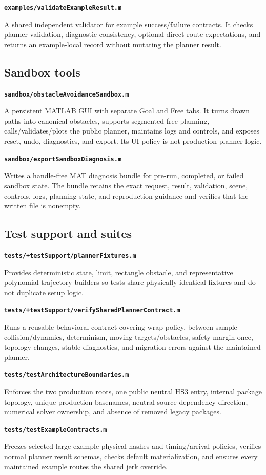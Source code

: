 \documentclass[10pt,letterpaper]{article}
\newcommand{\file}[1]{\nolinkurl{#1}}
\newcommand{\scriptentry}[2]{%
  \par\medskip\noindent\textbf{\file{#1}}\par
  \begingroup\raggedright #2\par\endgroup
}
\begin{document}
\scriptentry{examples/validateExampleResult.m}{A shared independent validator
for example success/failure contracts. It checks planner validation, diagnostic
consistency, optional direct-route expectations, and returns an example-local
record without mutating the planner result.}

\subsection{Sandbox tools}

\scriptentry{sandbox/obstacleAvoidanceSandbox.m}{A persistent MATLAB GUI with
separate Goal and Free tabs. It turns drawn paths into canonical obstacles,
supports segmented free planning, calls/validates/plots the public planner,
maintains logs and controls, and exposes reset, undo, diagnostics, and export.
Its UI policy is not production planner logic.}

\scriptentry{sandbox/exportSandboxDiagnosis.m}{Writes a handle-free MAT diagnosis
bundle for pre-run, completed, or failed sandbox state. The bundle retains the
exact request, result, validation, scene, controls, logs, planning state, and
reproduction guidance and verifies that the written file is nonempty.}

\subsection{Test support and suites}

\scriptentry{tests/+testSupport/plannerFixtures.m}{Provides deterministic state,
limit, rectangle obstacle, and representative polynomial trajectory builders so
tests share physically identical fixtures and do not duplicate setup logic.}

\scriptentry{tests/+testSupport/verifySharedPlannerContract.m}{Runs a reusable
behavioral contract covering wrap policy, between-sample collision/dynamics,
determinism, moving targets/obstacles, safety margin once, topology changes,
stable diagnostics, and migration errors against the maintained planner.}

\scriptentry{tests/testArchitectureBoundaries.m}{Enforces the two production
roots, one public neutral HS3 entry, internal package topology, unique production
basenames, neutral-source dependency direction, numerical solver ownership, and
absence of removed legacy packages.}

\scriptentry{tests/testExampleContracts.m}{Freezes selected large-example
physical hashes and timing/arrival policies, verifies normal planner result
schemas, checks default materialization, and ensures every maintained example
routes the shared jerk override.}
\end{document}
